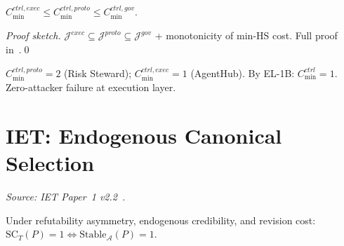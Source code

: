 \begin{theorem}[EL-1B]\label{thm:el-1b-app}
$C_{\min}^{ctrl,exec} \leq C_{\min}^{ctrl,proto} \leq C_{\min}^{ctrl,gov}$.
\end{theorem}

\begin{proof}[Proof sketch]
$\mathcal{J}^{exec} \subseteq \mathcal{J}^{proto} \subseteq \mathcal{J}^{gov}$
+ monotonicity of min-HS cost. Full proof in~\cite{proofs-companion}.\qed
\end{proof}

\begin{example}
$C_{\min}^{ctrl,proto}=2$ (Risk Steward); $C_{\min}^{ctrl,exec}=1$ (AgentHub).
By EL-1B: $C_{\min}^{ctrl}=1$. Zero-attacker failure at execution layer.
\end{example}

\section{IET: Endogenous Canonical Selection}
\label{app:iet}

\noindent\textit{Source: IET Paper~1 v2.2~\cite{iet-paper1}.}

\begin{theorem}\label{thm:iet-ecs-app}
Under refutability asymmetry, endogenous credibility, and revision cost:
$\mathrm{SC}_T(P)=1\iff\mathrm{Stable}_{\mathcal{A}}(P)=1$.
\end{theorem}
